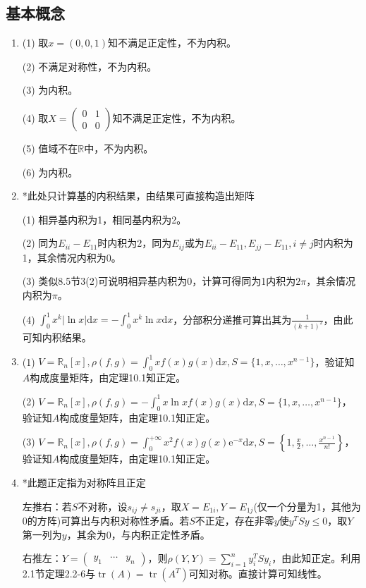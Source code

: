 \documentclass[a4paper,UTF8,fontset=windows]{ctexart}
\DeclareMathOperator{\tr}{tr}
\begin{document}
\subsection{基本概念}
\begin{enumerate}
\item
(1) 取$x=(0,0,1)$知不满足正定性，不为内积。

(2) 不满足对称性，不为内积。

(3) 为内积。

(4) 取$X=\begin{pmatrix}0&1\\0&0\end{pmatrix}$知不满足正定性，不为内积。

(5) 值域不在$\mathbb{R}$中，不为内积。

(6) 为内积。

\item
*此处只计算基的内积结果，由结果可直接构造出矩阵

(1) 相异基内积为1，相同基内积为2。

(2) 同为$E_{ii}-E_{11}$时内积为2，同为$E_{ij}$或为$E_{ii}-E_{11},E_{jj}-E_{11},i\ne j$时内积为1，其余情况内积为0。

(3) 类似8.5节3(2)可说明相异基内积为0，计算可得同为1内积为$2\pi$，其余情况内积为$\pi$。

(4) $\int_0^1x^k|\ln x|\mathrm{d}x=-\int_0^1x^k\ln x\mathrm{d}x$，分部积分递推可算出其为$\frac{1}{(k+1)^2}$，由此可知内积结果。

\item
(1) $V=\mathbb{R}_n[x],\rho(f,g)=\int_0^1xf(x)g(x)\mathrm{d}x,S=\{1,x,\dots,x^{n-1}\}$，验证知$A$构成度量矩阵，由定理10.1知正定。

(2) $V=\mathbb{R}_n[x],\rho(f,g)=-\int_0^1x\ln xf(x)g(x)\mathrm{d}x,S=\{1,x,\dots,x^{n-1}\}$，验证知$A$构成度量矩阵，由定理10.1知正定。

(3) $V=\mathbb{R}_n[x],\rho(f,g)=\int_0^{+\infty}x^2f(x)g(x)\mathrm{e}^{-x}\mathrm{d}x,S=\left\{1,\frac{x}{2},\dots,\frac{x^{n-1}}{n!}\right\}$，验证知$A$构成度量矩阵，由定理10.1知正定。

\item
*此题正定指为对称阵且正定

左推右：若$S$不对称，设$s_{ij}\ne s_{ji}$，取$X=E_{1i},Y=E_{1j}$(仅一个分量为1，其他为0的方阵)可算出与内积对称性矛盾。若$S$不正定，存在非零$y$使$y^TSy\le0$，取$Y$第一列为$y$，其余为0，与内积正定性矛盾。

右推左：$Y=\begin{pmatrix}y_1&\cdots&y_n\end{pmatrix}$，则$\rho(Y,Y)=\sum_{i=1}^ny_i^TSy_i$，由此知正定。利用2.1节定理2.2-6与$\tr(A)=\tr(A^T)$可知对称。直接计算可知线性。


\end{enumerate}
\end{document}
